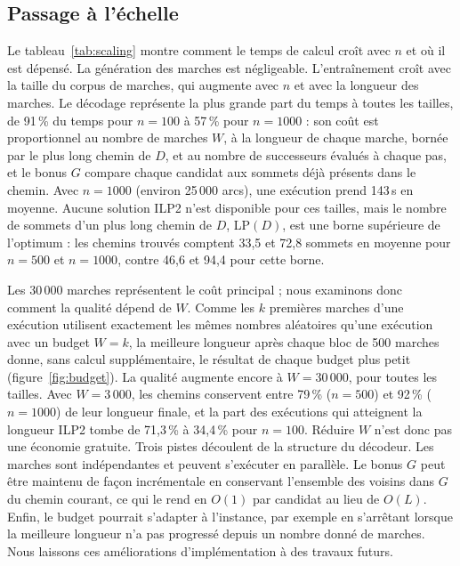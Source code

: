 \documentclass{llncs}
\begin{document}
\subsection{Passage à l'échelle}
\label{sec:scaling}

Le tableau~\ref{tab:scaling} montre comment le temps de calcul croît avec $n$ et où il est dépensé. La génération des marches est négligeable. L'entraînement croît avec la taille du corpus de marches, qui augmente avec $n$ et avec la longueur des marches. Le décodage représente la plus grande part du temps à toutes les tailles, de 91\,\% du temps pour $n=100$ à 57\,\% pour $n=1000$ : son coût est proportionnel au nombre de marches $W$, à la longueur de chaque marche, bornée par le plus long chemin de $D$, et au nombre de successeurs évalués à chaque pas, et le bonus $G$ compare chaque candidat aux sommets déjà présents dans le chemin. Avec $n=1000$ (environ 25\,000 arcs), une exécution prend 143\,s en moyenne. Aucune solution ILP2 n'est disponible pour ces tailles, mais le nombre de sommets d'un plus long chemin de $D$, LP$(D)$, est une borne supérieure de l'optimum : les chemins trouvés comptent 33,5 et 72,8 sommets en moyenne pour $n=500$ et $n=1000$, contre 46,6 et 94,4 pour cette borne.

\begin{table}[t]
\centering
\caption{Temps de calcul par phase et longueur des chemins selon $n$ (toutes les instances, cinq graines). $|A|$ et LP$(D)$ (sommets d'un plus long chemin de $D$) sont des moyennes sur les instances ; Longueur : moyenne $\pm$ écart-type, entre graines, de la moyenne ; Total : moyenne $\pm$ écart-type sur les exécutions.}
\label{tab:scaling}

\end{table}

Les 30\,000 marches représentent le coût principal ; nous examinons donc comment la qualité dépend de $W$. Comme les $k$ premières marches d'une exécution utilisent exactement les mêmes nombres aléatoires qu'une exécution avec un budget $W=k$, la meilleure longueur après chaque bloc de 500 marches donne, sans calcul supplémentaire, le résultat de chaque budget plus petit (figure~\ref{fig:budget}). La qualité augmente encore à $W=30\,000$, pour toutes les tailles. Avec $W=3\,000$, les chemins conservent entre 79\,\% ($n=500$) et 92\,\% ($n=1000$) de leur longueur finale, et la part des exécutions qui atteignent la longueur ILP2 tombe de 71,3\,\% à 34,4\,\% pour $n=100$. Réduire $W$ n'est donc pas une économie gratuite. Trois pistes découlent de la structure du décodeur. Les marches sont indépendantes et peuvent s'exécuter en parallèle. Le bonus $G$ peut être maintenu de façon incrémentale en conservant l'ensemble des voisins dans $G$ du chemin courant, ce qui le rend en $O(1)$ par candidat au lieu de $O(L)$. Enfin, le budget pourrait s'adapter à l'instance, par exemple en s'arrêtant lorsque la meilleure longueur n'a pas progressé depuis un nombre donné de marches. Nous laissons ces améliorations d'implémentation à des travaux futurs.
\end{document}

